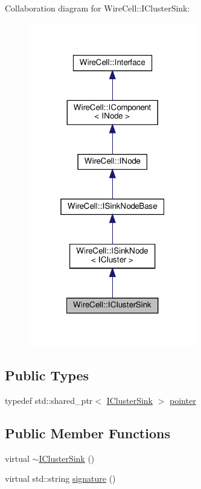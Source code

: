 Collaboration diagram for Wire\+Cell\+:\+:I\+Cluster\+Sink\+:
\nopagebreak
\begin{figure}[H]
\begin{center}
\leavevmode
\includegraphics[width=208pt]{class_wire_cell_1_1_i_cluster_sink__coll__graph}
\end{center}
\end{figure}
\subsection*{Public Types}
\begin{DoxyCompactItemize}
\item 
typedef std\+::shared\+\_\+ptr$<$ \hyperlink{class_wire_cell_1_1_i_cluster_sink}{I\+Cluster\+Sink} $>$ \hyperlink{class_wire_cell_1_1_i_cluster_sink_a8deee27cc959db3713d08b3d8e1403b1}{pointer}
\end{DoxyCompactItemize}
\subsection*{Public Member Functions}
\begin{DoxyCompactItemize}
\item 
virtual \hyperlink{class_wire_cell_1_1_i_cluster_sink_ab3a9af3c498ce3b908070a84e021aa5b}{$\sim$\+I\+Cluster\+Sink} ()
\item 
virtual std\+::string \hyperlink{class_wire_cell_1_1_i_cluster_sink_a0c940c8291898c059685fb78dcafa37c}{signature} ()
\end{DoxyCompactItemize}


